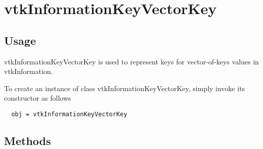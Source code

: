 \section{vtkInformationKeyVectorKey}

\subsection{Usage}

 vtkInformationKeyVectorKey is used to represent keys for
 vector-of-keys values in vtkInformation.

To create an instance of class vtkInformationKeyVectorKey, simply
invoke its constructor as follows
\begin{verbatim}
  obj = vtkInformationKeyVectorKey
\end{verbatim}
\subsection{Methods}

